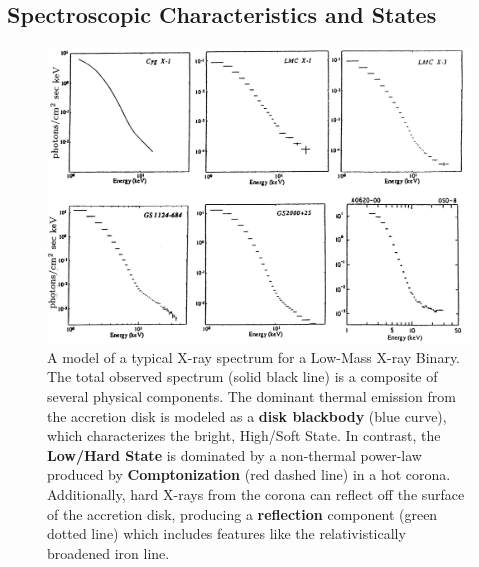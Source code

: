 \subsection{Spectroscopic Characteristics and States}

\begin{figure}[ht!]
    \centering
    \includegraphics[width=0.75\linewidth]{Pictures/figures/lmxb_spectra.png}
\caption{A model of a typical X-ray spectrum for a Low-Mass X-ray Binary. The total observed spectrum (solid black line) is a composite of several physical components. The dominant thermal emission from the accretion disk is modeled as a \textbf{disk blackbody} (blue curve), which characterizes the bright, High/Soft State. In contrast, the \textbf{Low/Hard State} is dominated by a non-thermal power-law produced by \textbf{Comptonization} (red dashed line) in a hot corona. Additionally, hard X-rays from the corona can reflect off the surface of the accretion disk, producing a \textbf{reflection} component (green dotted line) which includes features like the relativistically broadened iron line.}
\end{figure}

